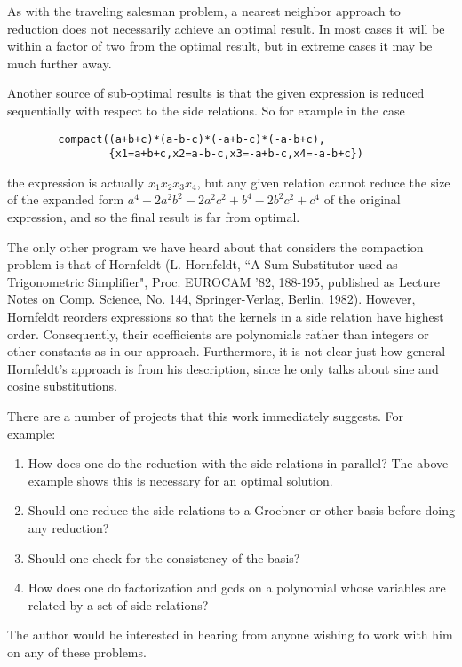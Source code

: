 As with the traveling salesman problem, a nearest neighbor approach to
reduction does not necessarily achieve an optimal result.  In most cases
it will be within a factor of two from the optimal result, but in extreme
cases it may be much further away.

Another source of sub-optimal results is that the given expression
is reduced sequentially with respect to the side relations.  So for
example in the case
\begin{verbatim}
        compact((a+b+c)*(a-b-c)*(-a+b-c)*(-a-b+c),
                {x1=a+b+c,x2=a-b-c,x3=-a+b-c,x4=-a-b+c})
\end{verbatim}
the expression is actually $x_{1}x_{2}x_{3}x_{4}$, but any given relation
cannot reduce the size of the expanded form
$a^{4}-2a^{2}b^{2}-2a^{2}c^{2}+b^{4}-2b^{2}c^{2}+c^{4}$
of the original expression, and so the final result is far from optimal.

The only other program we have heard about that considers the compaction
problem is that of Hornfeldt (L. Hornfeldt, ``A Sum-Substitutor used as
Trigonometric Simplifier", Proc. EUROCAM '82, 188-195, published as
Lecture Notes on Comp. Science, No. 144, Springer-Verlag, Berlin, 1982).
However, Hornfeldt reorders expressions so that the kernels in a side
relation have highest order.  Consequently, their coefficients are
polynomials rather than integers or other constants as in our approach.
Furthermore, it is not clear just how general Hornfeldt's approach is from
his description, since he only talks about sine and cosine substitutions.

There are a number of projects that this work immediately suggests.  For
example:
\begin{enumerate}
\item How does one do the reduction with the side relations in parallel?
The above example shows this is necessary for an optimal solution.

\item Should one reduce the side relations to a Groebner or other basis
before doing any reduction?

\item Should one check for the consistency of the basis?

\item How does one do factorization and gcds on a polynomial whose
variables are related by a set of side relations?
\end{enumerate}

The author would be interested in hearing from anyone wishing to work with
him on any of these problems.

